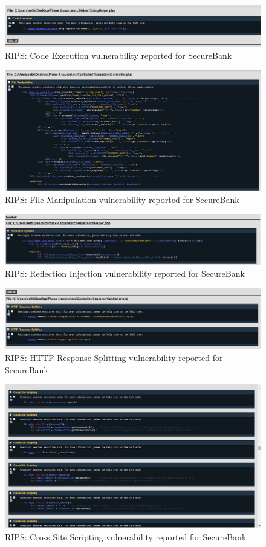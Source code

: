 \begin{figure}[ht]
	\centering
	\includegraphics[width=.8\linewidth]{figures/rips_code_execution_secure_bank.png}
	\caption{RIPS: Code Execution vulnerability reported for SecureBank}
	\label{fig:rips_code_execution_secure_bank}
\end{figure}

\begin{figure}[ht]
	\centering
	\includegraphics[width=.8\linewidth]{figures/rips_file_manipulation_secure_bank.png}
	\caption{RIPS: File Manipulation vulnerability reported for SecureBank}
	\label{fig:rips_file_manipulation_secure_bank}
\end{figure}

\begin{figure}[ht]
	\centering
	\includegraphics[width=.8\linewidth]{figures/rips_reflection_injection_secure_bank.png}
	\caption{RIPS: Reflection Injection vulnerability reported for SecureBank}
	\label{fig:rips_reflection_injection_secure_bank}
\end{figure}

\begin{figure}[ht]
	\centering
	\includegraphics[width=.8\linewidth]{figures/rips_http_resp_splitting_secure_bank.png}
	\caption{RIPS: HTTP Response Splitting vulnerability reported for SecureBank}
	\label{fig:rips_http_resp_splitting_secure_bank}
\end{figure}


\begin{figure}[ht]
	\centering
	\includegraphics[width=.8\linewidth]{figures/rips_xss_secure_bank.png}
	\caption{RIPS: Cross Site Scripting vulnerability reported for SecureBank}
	\label{fig:rips_xss_secure_bank}
\end{figure}